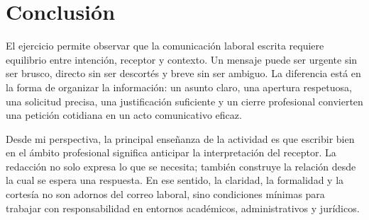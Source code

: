 \documentclass[
	spanish,
	letterpaper, oneside
]{article}
\begin{document}
\section{Conclusión}

El ejercicio permite observar que la comunicación laboral escrita requiere equilibrio entre intención, receptor y contexto. Un mensaje puede ser urgente sin ser brusco, directo sin ser descortés y breve sin ser ambiguo. La diferencia está en la forma de organizar la información: un asunto claro, una apertura respetuosa, una solicitud precisa, una justificación suficiente y un cierre profesional convierten una petición cotidiana en un acto comunicativo eficaz.

Desde mi perspectiva, la principal enseñanza de la actividad es que escribir bien en el ámbito profesional significa anticipar la interpretación del receptor. La redacción no solo expresa lo que se necesita; también construye la relación desde la cual se espera una respuesta. En ese sentido, la claridad, la formalidad y la cortesía no son adornos del correo laboral, sino condiciones mínimas para trabajar con responsabilidad en entornos académicos, administrativos y jurídicos.


\end{document}
